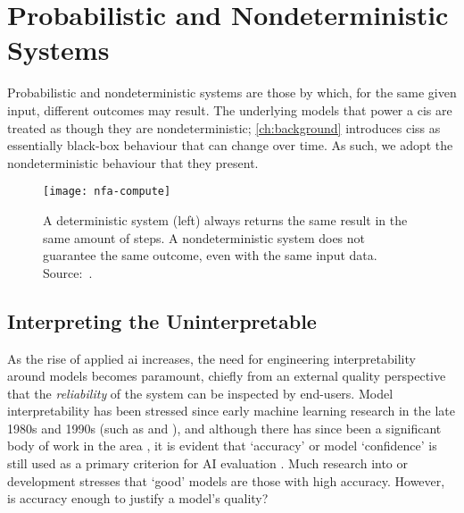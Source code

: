 \section{Probabilistic and Nondeterministic Systems}
\label{sec:background:probabilistic-stochastic}

Probabilistic and nondeterministic systems are those by which, for the same given input, different outcomes may result. The underlying models that power a \gls{cis} are treated as though they are nondeterministic; \cref{ch:background} introduces \glspl{cis} as essentially black-box behaviour that can change over time. As such, we adopt the nondeterministic behaviour that they present.

\begin{figure}[h!]
  \centering
  \texttt{[image: nfa-compute]}
  \caption[Deterministic versus nondeterministic systems]{A deterministic system (left) always returns the same result in the same amount of steps. A nondeterministic system does not guarantee the same outcome, even with the same input data. Source:~\citep{Finalyson:2018aa}.}
  \label{fig:background:probabilistic-stochastic:nfa-compute}
\end{figure}

\subsection{Interpreting the Uninterpretable}
\label{ssec:background:probabilistic-stochastic:model-interpretability}

As the rise of applied \gls{ai} increases, the need for engineering interpretability around models becomes paramount, chiefly from an external quality perspective that the \textit{reliability} of the system can be inspected by end-users. Model interpretability has been stressed since early machine learning research in the late 1980s and 1990s (such as \citet{Quinlan:1999ue} and \citet{Michie:1988te}), and although there has since been a significant body of work in the area \citep{Singh:2016wu,Baehrens:2010tj,Ribeiro:2016gg,Bussone:2015wm,Ross:2017vn,Lipton:2016if,Boz:2002uv,Johansson:2009uo,Augasta:2012wx,Fung:2005we,Dejaeger:2012up,VanAssche:2007wc,BenDavid:1995up,Feelders:2000ve,Lima:2009tm,Martens:2011uh,Pazzani:1997vp,Verbeke:2011vo}, it is evident that `accuracy' or model `confidence' is still used as a primary criterion for AI evaluation \citep{Huang:2005tc,Japkowicz:2011vy,Sokolova:2009vu}. Much research into  or  development stresses that `good' models are those with high accuracy. However, is accuracy enough to justify a model's quality?

